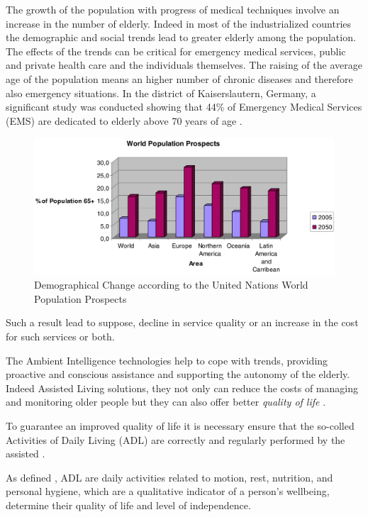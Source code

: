 \documentclass{thesisreport}
\begin{document}
  The growth of the population with progress of medical techniques involve an increase in the number of elderly. Indeed in most of the industrialized countries the demographic and social trends lead to greater elderly among the population. The effects of the trends can be critical for emergency medical services, public and private health care and the individuals themselves. 
 The raising of the average age of the population means an higher number of chronic diseases and therefore also emergency situations. 
 In the district of Kaiserslautern, Germany, a significant study was conducted showing that 44\% of Emergency Medical Services (EMS) are dedicated to elderly above 70 years of age \cite{kleinberger2007ambient}.
 	\begin{figure}[H]
		\centering
		\includegraphics[width=12cm]{Thesis/data/populationProspect.png}
		\caption{\small{Demographical Change according to the United Nations World Population Prospects \cite{kleinberger2007ambient}}}
		\label{fig:populationProspect}
	\end{figure}
 Such a result lead to suppose, decline in service quality or an increase in the cost for such services or both. 
 
 \parskip  \parskip
 
 The Ambient Intelligence technologies help to cope with trends, providing proactive and conscious assistance and supporting the autonomy of the elderly. Indeed Assisted Living solutions, they not only can reduce the costs of managing and monitoring older people but they can also offer better \textit{quality of life} \cite{kleinberger2007ambient}.
 
  To guarantee an improved quality of life it is necessary ensure that the so-colled Activities of Daily Living (ADL) are correctly and regularly performed by the assisted \cite{buoncompagni2017towards}.
 
 As defined \cite{buoncompagni2017towards}, ADL are daily activities related to motion, rest, nutrition, and personal hygiene, which are a qualitative indicator of a person’s wellbeing, determine their quality of life and level of independence. 
 
\end{document}

